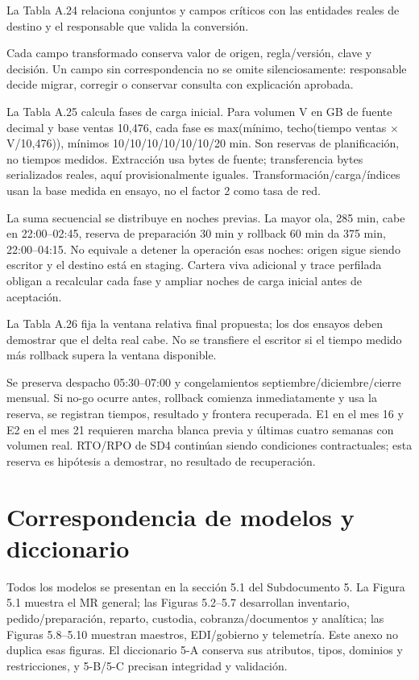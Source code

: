 La Tabla A.24 relaciona conjuntos y campos críticos con las entidades reales de destino y el responsable que valida la conversión.


Cada campo transformado conserva valor de origen, regla/versión, clave y decisión. Un campo sin correspondencia no se omite silenciosamente: responsable decide migrar, corregir o conservar consulta con explicación aprobada.

La Tabla A.25 calcula fases de carga inicial. Para volumen V en GB de fuente decimal y base ventas 10,476, cada fase es max(mínimo, techo(tiempo ventas \ensuremath{\times} V/10,476)), mínimos 10/10/10/10/10/10/20 min. Son reservas de planificación, no tiempos medidos. Extracción usa bytes de fuente; transferencia bytes serializados reales, aquí provisionalmente iguales. Transformación/carga/índices usan la base medida en ensayo, no el factor 2 como tasa de red.


La suma secuencial se distribuye en noches previas. La mayor ola, 285 min, cabe en 22:00–02:45, reserva de preparación 30 min y rollback 60 min da 375 min, 22:00–04:15. No equivale a detener la operación esas noches: origen sigue siendo escritor y el destino está en staging. Cartera viva adicional y trace perfilada obligan a recalcular cada fase y ampliar noches de carga inicial antes de aceptación.

La Tabla A.26 fija la ventana relativa final propuesta; los dos ensayos deben demostrar que el delta real cabe. No se transfiere el escritor si el tiempo medido más rollback supera la ventana disponible.


Se preserva despacho 05:30–07:00 y congelamientos septiembre/diciembre/cierre mensual. Si no-go ocurre antes, rollback comienza inmediatamente y usa la reserva, se registran tiempos, resultado y frontera recuperada. E1 en el mes 16 y E2 en el mes 21 requieren marcha blanca previa y últimas cuatro semanas con volumen real. RTO/RPO de SD4 continúan siendo condiciones contractuales; esta reserva es hipótesis a demostrar, no resultado de recuperación.

\section{Correspondencia de modelos y diccionario}
\label{anexo-5l}

Todos los modelos se presentan en la sección 5.1 del Subdocumento 5. La Figura 5.1 muestra el MR general; las Figuras 5.2–5.7 desarrollan inventario, pedido/preparación, reparto, custodia, cobranza/documentos y analítica; las Figuras 5.8–5.10 muestran maestros, EDI/gobierno y telemetría. Este anexo no duplica esas figuras. El diccionario 5-A conserva sus atributos, tipos, dominios y restricciones, y 5-B/5-C precisan integridad y validación.

